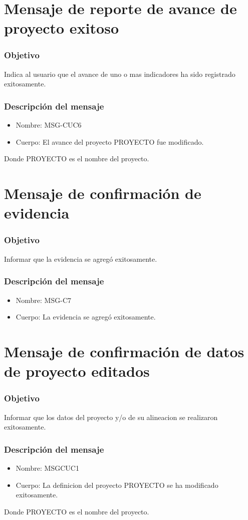 \section{Mensaje de reporte de avance de proyecto exitoso} \label{MSG_CUC6}

\subsubsection{Objetivo}
Indica al usuario que el avance de uno o mas indicadores ha sido registrado exitosamente.

\subsubsection{Descripción del mensaje}
\begin{itemize}
\item Nombre: MSG-CUC6
\item Cuerpo: El avance del proyecto PROYECTO fue modificado. 
\end{itemize}

Donde PROYECTO es el nombre del proyecto.

\section{Mensaje de confirmación de evidencia} \label{MSGc7}
\subsubsection{Objetivo}
Informar que la evidencia se agregó exitosamente.
\subsubsection{Descripción del mensaje}
\begin{itemize}
\item Nombre: MSG-C7
\item Cuerpo: La evidencia se agregó exitosamente.
\end{itemize}


\section{Mensaje de confirmación de datos de proyecto editados} \label{MSGCUC1}
\subsubsection{Objetivo}
Informar que los datos del proyecto y/o de su alineacion se realizaron exitosamente.
\subsubsection{Descripción del mensaje}
\begin{itemize}
\item Nombre: MSGCUC1
\item Cuerpo: La definicion del proyecto PROYECTO se ha modificado exitosamente.
\end{itemize}

Donde PROYECTO es el nombre del proyecto.